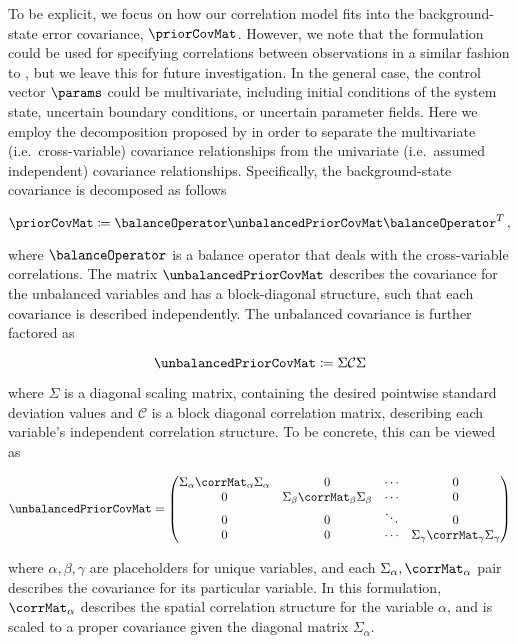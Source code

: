 \documentclass[alpha-refs]{wiley-article}
\begin{document}
To be explicit, we focus on how our correlation model fits into the
background-state error covariance, $\priorCovMat$.
However, we note that the formulation could be used for specifying correlations
between observations in a similar fashion to \citet{guillet_modelling_2019}, but
we leave this for future investigation.
In the general case, the control vector $\params$ could be multivariate,
including initial conditions of the system state, uncertain boundary
conditions, or uncertain parameter fields.
Here we employ the decomposition proposed by
\citet{derber_reformulation_1999}
in order to separate the multivariate (i.e.\ cross-variable)
covariance relationships from the univariate (i.e.\ assumed
independent) covariance relationships.
Specifically, the background-state covariance is decomposed as follows
\begin{linenomath*}\begin{equation*}
    \priorCovMat \coloneqq \balanceOperator\unbalancedPriorCovMat\balanceOperator^T \,
    ,
\end{equation*}\end{linenomath*}
where $\balanceOperator$ is a balance operator that deals with the
cross-variable correlations.
The matrix $\unbalancedPriorCovMat$ describes the covariance for the unbalanced
variables and has a block-diagonal structure, such that each
covariance is described independently.
The unbalanced covariance is further factored as
\begin{linenomath*}\begin{equation*}
    \unbalancedPriorCovMat \coloneqq \Sigma \mathcal{C} \Sigma
\end{equation*}\end{linenomath*}
where $\Sigma$ is a diagonal scaling matrix, containing the desired pointwise
standard deviation values and $\mathcal{C}$ is a block diagonal correlation matrix,
describing each variable's independent correlation structure.
To be concrete, this can be viewed as
\begin{linenomath*}\begin{equation*}
    \unbalancedPriorCovMat =
    \begin{pmatrix}
        \Sigma_\alpha\corrMat_\alpha\Sigma_\alpha & 0 & \cdots & 0 \\
        0 & \Sigma_\beta\corrMat_\beta\Sigma_\beta & \cdots & 0 \\
        0 & 0 & \ddots & 0  \\
        0 & 0 & \cdots & \Sigma_\gamma\corrMat_\gamma\Sigma_\gamma \\
    \end{pmatrix}
\end{equation*}\end{linenomath*}
where $\alpha, \beta, \gamma$ are placeholders for unique variables,
and each $\Sigma_\alpha, \corrMat_\alpha$ pair describes the covariance for its
particular variable.
In this formulation, $\corrMat_\alpha$ describes the spatial correlation
structure for the variable $\alpha$, and is scaled to a proper covariance given the
diagonal matrix $\Sigma_\alpha$.
\end{document}
